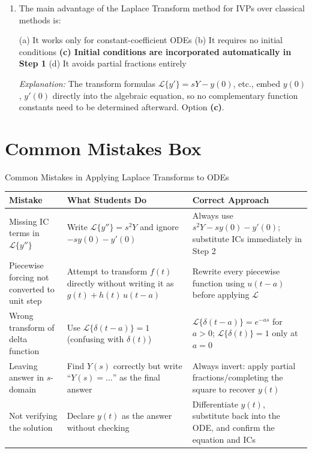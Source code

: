 \documentclass[12pt,a4paper]{article}
\begin{document}
\begin{enumerate}
\item The main advantage of the Laplace Transform method for IVPs over classical methods is:

(a) It works only for constant-coefficient ODEs \quad
(b) It requires no initial conditions \quad
\textbf{(c) Initial conditions are incorporated automatically in Step 1} \quad
(d) It avoids partial fractions entirely

\textit{Explanation:} The transform formulas $\mathcal{L}\{y'\}=sY-y(0)$, etc., embed
$y(0)$, $y'(0)$ directly into the algebraic equation, so no complementary function
constants need to be determined afterward. Option \textbf{(c)}.

\end{enumerate}

\section{Common Mistakes Box}

\begin{mistakebox}{Common Mistakes in Applying Laplace Transforms to ODEs}
\begin{tabular}{@{}p{3.5cm}p{5cm}p{5cm}@{}}
\toprule
\textbf{Mistake} & \textbf{What Students Do} & \textbf{Correct Approach} \\
\midrule
Missing IC terms in $\mathcal{L}\{y''\}$ &
Write $\mathcal{L}\{y''\} = s^2Y$ and ignore $-sy(0)-y'(0)$ &
Always use $s^2Y - sy(0) - y'(0)$; substitute ICs immediately in Step 2 \\
\midrule
Piecewise forcing not converted to unit step &
Attempt to transform $f(t)$ directly without writing it as $g(t)+h(t)\,u(t-a)$ &
Rewrite every piecewise function using $u(t-a)$ before applying $\mathcal{L}$ \\
\midrule
Wrong transform of delta function &
Use $\mathcal{L}\{\delta(t-a)\}=1$ (confusing with $\delta(t)$) &
$\mathcal{L}\{\delta(t-a)\} = e^{-as}$ for $a>0$; $\mathcal{L}\{\delta(t)\}=1$ only at $a=0$ \\
\midrule
Leaving answer in $s$-domain &
Find $Y(s)$ correctly but write ``$Y(s) = \ldots$'' as the final answer &
Always invert: apply partial fractions/completing the square to recover $y(t)$ \\
\midrule
Not verifying the solution &
Declare $y(t)$ as the answer without checking &
Differentiate $y(t)$, substitute back into the ODE, and confirm the equation and ICs \\
\bottomrule
\end{tabular}
\end{mistakebox}
\end{document}
